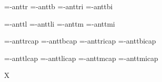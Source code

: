 
\ifx\sizespec\undefined \def\sizespec{}\fi
\ifx\font\corkencoded {}\else {}\fi


\font\tenrm=\tmp-anttr  \sizespec
\font\tenbf=\tmp-anttb  \sizespec
\font\tenit=\tmp-anttri \sizespec
\font\tenbi=\tmp-anttbi \sizespec

\font\tenlr=\tmp-anttl  \sizespec  \def\lr{\tenlr}
\font\tenli=\tmp-anttli \sizespec  \def\li{\tenli}
\font\tenmr=\tmp-anttm  \sizespec  \def\mr{\tenmr}
\font\tenmi=\tmp-anttmi \sizespec  \def\mi{\tenmi}

\font\tenrmc=\tmp-anttrcap  \sizespec
\font\tenbfc=\tmp-anttbcap  \sizespec
\font\tenitc=\tmp-anttricap \sizespec
\font\tenbic=\tmp-anttbicap \sizespec

\font\tenlrc=\tmp-anttlcap  \sizespec 
\font\tenlic=\tmp-anttlicap \sizespec
\font\tenmrc=\tmp-anttmcap  \sizespec
\font\tenmic=\tmp-anttmicap \sizespec

\tenrm


\def\caps#1{{\escapechar=-1 \expandafter}%
  \expandafter\csname\expandafter\tenonlytext\string#1c\endcsname}
\def\tenonlytext{ten}

\ifx\regfont\undefined \else
   \regfont\tenlr  \regfont\tenli
   \regfont\tenmr  \regfont\tenmi
   \regfont\tenrmc \regfont\tenitc
   \regfont\tenbfc \regfont\tenbic
   \regfont\tenlrc \regfont\tenlic
   \regfont\tenmrc \regfont\tenmic
\fi

\def\txr{cs-anttr} \def\txmi{mi-anttri} 
\def\txb{cs-anttb} \def\txbi{mi-anttbi}

\ifx\font\corkencoded\else \ifx\font\unicoded\else  \fi\fi
\ifx\mathpreloaded X\else  \fi                     

